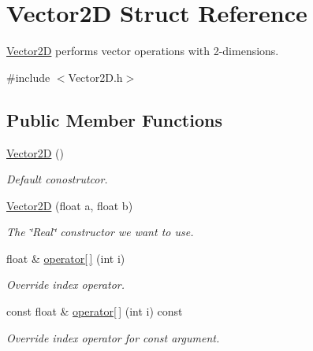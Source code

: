 \hypertarget{struct_vector2_d}{}\section{Vector2D Struct Reference}
\label{struct_vector2_d}


\mbox{\hyperlink{struct_vector2_d}{Vector2D}} performs vector operations with 2-\/dimensions.  




{\ttfamily \#include $<$Vector2\+D.\+h$>$}

\subsection*{Public Member Functions}
\begin{DoxyCompactItemize}
\item 
\mbox{\label{struct_vector2_d_a98e9997ebb7a629f4db52397d4e0d653}} 
\mbox{\hyperlink{struct_vector2_d_a98e9997ebb7a629f4db52397d4e0d653}{Vector2D}} ()
\begin{DoxyCompactList}\small\item\em Default conostrutcor. \end{DoxyCompactList}\item 
\mbox{\hyperlink{struct_vector2_d_ab34332f542a2eef92e4a52548f753587}{Vector2D}} (float a, float b)
\begin{DoxyCompactList}\small\item\em The \char`\"{}\+Real\char`\"{} constructor we want to use. \end{DoxyCompactList}\item 
float \& \mbox{\hyperlink{struct_vector2_d_a27095684e7731a0ebbf2db95e257b9fc}{operator\mbox{[}$\,$\mbox{]}}} (int i)
\begin{DoxyCompactList}\small\item\em Override index operator. \end{DoxyCompactList}\item 
const float \& \mbox{\hyperlink{struct_vector2_d_a92f3c89557503a377c79ddcf99d9be13}{operator\mbox{[}$\,$\mbox{]}}} (int i) const
\begin{DoxyCompactList}\small\item\em Override index operator for const argument. \end{DoxyCompactList}\item 
\mbox{\label{struct_vector2_d_a815fe748cc2d626d7df98e5399759982}} 

\end{DoxyCompactItemize}
